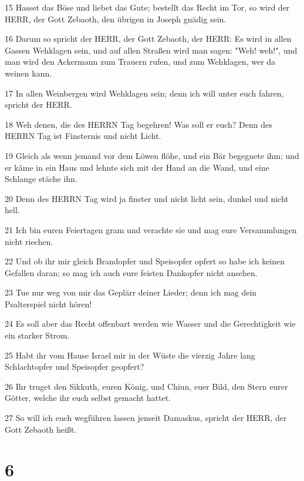 \par 15 Hasset das Böse und liebet das Gute; bestellt das Recht im Tor, so wird der HERR, der Gott Zebaoth, den übrigen in Joseph gnädig sein.
\par 16 Darum so spricht der HERR, der Gott Zebaoth, der HERR: Es wird in allen Gassen Wehklagen sein, und auf allen Straßen wird man sagen: "Weh! weh!", und man wird den Ackermann zum Trauern rufen, und zum Wehklagen, wer da weinen kann.
\par 17 In allen Weinbergen wird Wehklagen sein; denn ich will unter euch fahren, spricht der HERR.
\par 18 Weh denen, die des HERRN Tag begehren! Was soll er euch? Denn des HERRN Tag ist Finsternis und nicht Licht.
\par 19 Gleich als wenn jemand vor dem Löwen flöhe, und ein Bär begegnete ihm; und er käme in ein Haus und lehnte sich mit der Hand an die Wand, und eine Schlange stäche ihn.
\par 20 Denn des HERRN Tag wird ja finster und nicht licht sein, dunkel und nicht hell.
\par 21 Ich bin euren Feiertagen gram und verachte sie und mag eure Versammlungen nicht riechen.
\par 22 Und ob ihr mir gleich Brandopfer und Speisopfer opfert so habe ich keinen Gefallen daran; so mag ich auch eure feisten Dankopfer nicht ansehen.
\par 23 Tue nur weg von mir das Geplärr deiner Lieder; denn ich mag dein Psalterspiel nicht hören!
\par 24 Es soll aber das Recht offenbart werden wie Wasser und die Gerechtigkeit wie ein starker Strom.
\par 25 Habt ihr vom Hause Israel mir in der Wüste die vierzig Jahre lang Schlachtopfer und Speisopfer geopfert?
\par 26 Ihr truget den Sikkuth, euren König, und Chiun, euer Bild, den Stern eurer Götter, welche ihr euch selbst gemacht hattet.
\par 27 So will ich euch wegführen lassen jenseit Damaskus, spricht der HERR, der Gott Zebaoth heißt.

\chapter{6}

